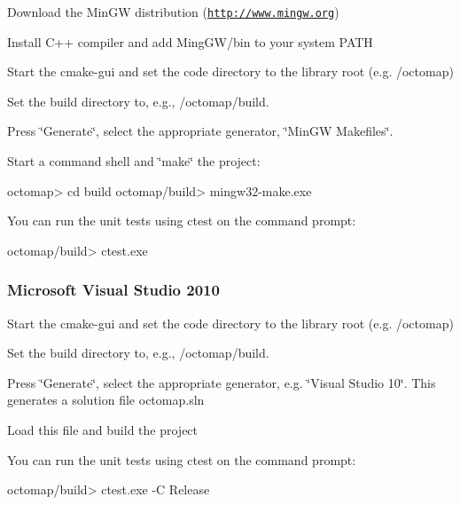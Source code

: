 \begin{DoxyEnumerate}
\item Download the Min\+G\+W distribution (\href{http://www.mingw.org}{\tt http\+://www.\+mingw.\+org})
\item Install C++ compiler and add Ming\+G\+W/bin to your system P\+A\+T\+H
\item Start the cmake-\/gui and set the code directory to the library root (e.\+g. {\ttfamily /octomap})
\item Set the build directory to, e.\+g., {\ttfamily /octomap/build}.
\item Press \char`\"{}\+Generate\char`\"{}, select the appropriate generator, \char`\"{}\+Min\+G\+W Makefiles\char`\"{}.
\item Start a command shell and \char`\"{}make\char`\"{} the project\+: \begin{DoxyVerb} octomap> cd build
 octomap/build> mingw32-make.exe
\end{DoxyVerb}

\end{DoxyEnumerate}

You can run the unit tests using ctest on the command prompt\+: \begin{DoxyVerb}octomap/build> ctest.exe
\end{DoxyVerb}


\subsubsection*{Microsoft Visual Studio 2010}


\begin{DoxyEnumerate}
\item Start the cmake-\/gui and set the code directory to the library root (e.\+g. {\ttfamily /octomap})
\item Set the build directory to, e.\+g., /octomap/build.
\item Press \char`\"{}\+Generate\char`\"{}, select the appropriate generator, e.\+g. \char`\"{}\+Visual Studio 10\char`\"{}. This generates a solution file octomap.\+sln
\item Load this file and build the project
\end{DoxyEnumerate}

You can run the unit tests using ctest on the command prompt\+: \begin{DoxyVerb}octomap/build> ctest.exe -C Release\end{DoxyVerb}
 